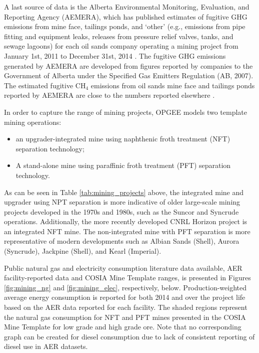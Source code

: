 \documentclass[11pt]{report}
\begin{document}
A last source of data is the Alberta Environmental Monitoring, Evaluation, and Reporting Agency (AEMERA), which has published estimates of fugitive GHG emissions from mine face, tailings ponds, and `other' (e.g., emissions from pipe fitting and equipment leaks, releases from pressure relief valves, tanks, and sewage lagoons) for each oil sands company operating a mining project from January 1st, 2011 to December 31st, 2014 \cite{AEMERA2015}. The fugitive GHG emissions generated by AEMERA are developed from figures reported by companies to the Government of Alberta under the Specified Gas Emitters Regulation (AB, 2007). The estimated fugitive CH$_4$ emissions from oil sands mine face and tailings ponds reported by AEMERA are close to the numbers reported elsewhere \cite{Johnson2016, GHGenius4.03}.

In order to capture the range of mining projects, OPGEE models two template mining operations: 
\begin{itemize}
\item an upgrader-integrated mine using naphthenic froth treatment (NFT) separation technology;
\item A stand-alone mine using paraffinic froth treatment (PFT) separation technology.
\end{itemize}

As can be seen in Table \ref{tab:mining_projects} above, the integrated mine and upgrader using NPT separation is more indicative of older large-scale mining projects developed in the 1970s and 1980s, such as the Suncor and Syncrude operations.  Additionally, the more recently developed CNRL Horizon project is an integrated NFT mine.  The non-integrated mine with PFT separation is more representative of modern developments such as Albian Sands (Shell), Aurora (Syncrude), Jackpine (Shell), and Kearl (Imperial). 

Public natural gas and electricity consumption literature data available, AER facility-reported data and COSIA Mine Template ranges, is presented in Figures \ref{fig:mining_ng} and \ref{fig:mining_elec}, respectively, below. Production-weighted average energy consumption is reported for both 2014 and over the project life based on the AER data reported for each facility. The shaded regions represent the natural gas consumption for NFT and PFT mines presented in the COSIA Mine Template for low grade and high grade ore. Note that no corresponding graph can be created for diesel consumption due to lack of consistent reporting of diesel use in AER datasets.
\end{document}
